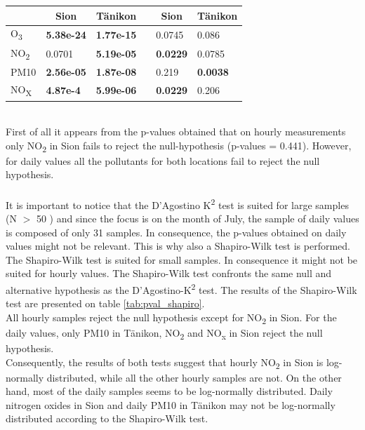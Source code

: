 \documentclass[a4paper, 12pt]{article}
\begin{document}
\begin{table}[t]
\begin{minipage}{0.50\textwidth}
{\begin{tabular}{@{}llllll@{}}
                                 & \multicolumn{1}{c}{Sion} & \multicolumn{1}{c}{Tänikon} &  & \multicolumn{1}{c}{Sion} & \multicolumn{1}{c}{Tänikon} \\ \midrule
            O\textsubscript{3}   & \textbf{5.38e-24}        & \textbf{1.77e-15}           &  & 0.0745                   & 0.086                       \\
            NO\textsubscript{2}  & 0.0701                   & \textbf{5.19e-05}           &  & \textbf{0.0229}          & 0.0785                      \\
            PM10                 & \textbf{2.56e-05}        & \textbf{1.87e-08}           &  & 0.219                    & \textbf{0.0038}             \\
            NO\textsubscript{X}  & \textbf{4.87e-4}         & \textbf{5.99e-06}           &  & \textbf{0.0229}          & 0.206                       \\ \bottomrule
            \end{tabular}%
            }
        \end{minipage}%
    \end{table}
    \\
    First of all it appears from the p-values obtained that on hourly measurements only NO\textsubscript{2} in Sion fails to reject the null-hypothesis (p-values = 0.441). However, for daily values all the pollutants for both locations fail to reject the null hypothesis. 
    \\
    \\
    It is important to notice that the D’Agostino K\textsuperscript{2} test is suited for large samples (N $>$ 50 \cite{RalphB1990}) and since the focus is on the month of July, the sample of daily values is composed of only 31 samples. In consequence, the p-values obtained on daily values might not be relevant. This is why also a Shapiro-Wilk test is performed. The Shapiro-Wilk test is suited for small samples. In consequence it might not be suited for hourly values. The Shapiro-Wilk test confronts the same null and alternative hypothesis as the D’Agostino-K\textsuperscript{2} test. The results of the Shapiro-Wilk test are presented on table \ref{tab:pval_shapiro}.
    \\
    All hourly samples reject the null hypothesis except for NO\textsubscript{2} in Sion. For the daily values, only PM10 in Tänikon, NO\textsubscript{2} and NO\textsubscript{x} in Sion reject the null hypothesis. 
    \\
    Consequently, the results of both tests suggest that hourly NO\textsubscript{2} in Sion is log-normally distributed, while all the other hourly samples are not. On the other hand, most of the daily samples seems to be log-normally distributed. Daily nitrogen oxides in Sion and daily PM10 in Tänikon may not be log-normally distributed according to the Shapiro-Wilk test. 
\end{document}

